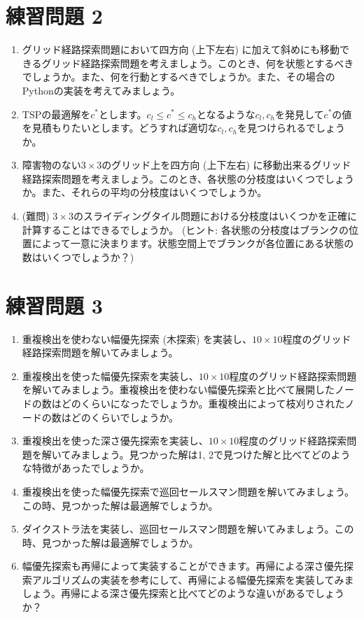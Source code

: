
\section{練習問題 2}

\begin{enumerate}
  \item グリッド経路探索問題において四方向 (上下左右) に加えて斜めにも移動できるグリッド経路探索問題を考えましょう。このとき、何を状態とするべきでしょうか。また、何を行動とするべきでしょうか。また、その場合のPythonの実装を考えてみましょう。

  \item TSPの最適解を$c^*$とします。$c_l \leq c^* \leq c_h$となるような$c_l, c_h$を発見して$c^*$の値を見積もりたいとします。どうすれば適切な$c_l, c_h$を見つけられるでしょうか。

  \item 障害物のない$3 \times 3$のグリッド上を四方向 (上下左右) に移動出来るグリッド経路探索問題を考えましょう。このとき、各状態の分枝度はいくつでしょうか。また、それらの平均の分枝度はいくつでしょうか。

  \item (難問) $3 \times 3$のスライディングタイル問題における分枝度はいくつかを正確に計算することはできるでしょうか。
  (ヒント: 各状態の分枝度はブランクの位置によって一意に決まります。状態空間上でブランクが各位置にある状態の数はいくつでしょうか？)
  
\end{enumerate}


\section{練習問題 3}

\begin{enumerate}
	\item 重複検出を使わない幅優先探索 (木探索) を実装し、$10 \times 10$程度のグリッド経路探索問題を解いてみましょう。

	\item 重複検出を使った幅優先探索を実装し、$10 \times 10$程度のグリッド経路探索問題を解いてみましょう。重複検出を使わない幅優先探索と比べて展開したノードの数はどのくらいになったでしょうか。重複検出によって枝刈りされたノードの数はどのくらいでしょうか。
	
	\item 重複検出を使った深さ優先探索を実装し、$10 \times 10$程度のグリッド経路探索問題を解いてみましょう。見つかった解は1, 2で見つけた解と比べてどのような特徴があったでしょうか。
	
	\item 重複検出を使った幅優先探索で巡回セールスマン問題を解いてみましょう。この時、見つかった解は最適解でしょうか。
	
	\item ダイクストラ法を実装し、巡回セールスマン問題を解いてみましょう。この時、見つかった解は最適解でしょうか。
	
	\item 幅優先探索も再帰によって実装することができます。再帰による深さ優先探索アルゴリズムの実装を参考にして、再帰による幅優先探索を実装してみましょう。再帰による深さ優先探索と比べてどのような違いがあるでしょうか？
\end{enumerate}


